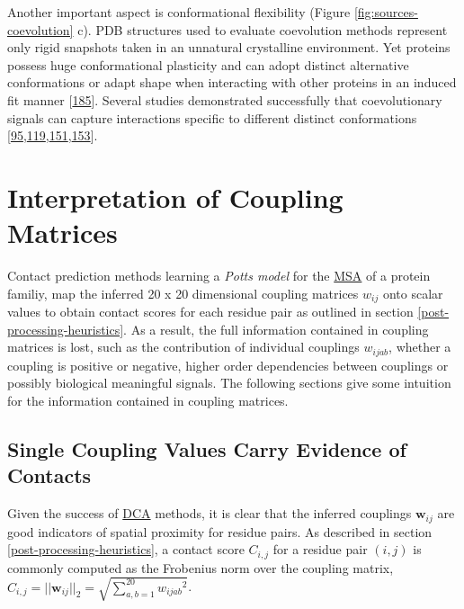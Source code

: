 \documentclass[11pt,a4paper,twoside]{book}
\newcommand{\wij}{\mathbf{w}_{ij}}
\newcommand{\wijab}{w_{ijab}}
\theoremstyle{definition}
\theoremstyle{definition}
\theoremstyle{remark}
\begin{document}
Another important aspect is conformational flexibility (Figure
\ref{fig:sources-coevolution} c). PDB structures used to evaluate
coevolution methods represent only rigid snapshots taken in an unnatural
crystalline environment. Yet proteins possess huge conformational
plasticity and can adopt distinct alternative conformations or adapt
shape when interacting with other proteins in an induced fit manner
{[}\protect\hyperlink{ref-Noel2016}{185}{]}. Several studies
demonstrated successfully that coevolutionary signals can capture
interactions specific to different distinct conformations
{[}\protect\hyperlink{ref-Morcos2011}{95},\protect\hyperlink{ref-Hopf2012}{119},\protect\hyperlink{ref-Sfriso2016}{151},\protect\hyperlink{ref-Jana2014}{153}{]}.

\chapter{Interpretation of Coupling
Matrices}\label{interpreting-coupling-matrices}

Contact prediction methods learning a \emph{Potts model} for the
\protect\hyperlink{abbrev}{MSA} of a protein familiy, map the inferred
20 x 20 dimensional coupling matrices \(w_{ij}\) onto scalar values to
obtain contact scores for each residue pair as outlined in section
\ref{post-processing-heuristics}. As a result, the full information
contained in coupling matrices is lost, such as the contribution of
individual couplings \(\wijab\), whether a coupling is positive or
negative, higher order dependencies between couplings or possibly
biological meaningful signals. The following sections give some
intuition for the information contained in coupling matrices.

\section{Single Coupling Values Carry Evidence of
Contacts}\label{correlation-between-couplings-and-class}

Given the success of \protect\hyperlink{abbrev}{DCA} methods, it is
clear that the inferred couplings \(\wij\) are good indicators of
spatial proximity for residue pairs. As described in section
\ref{post-processing-heuristics}, a contact score \(C_{i,j}\) for a
residue pair \((i,j)\) is commonly computed as the Frobenius norm over
the coupling matrix,
\(C_{i,j}=||\wij||_2 = \sqrt{\sum_{a,b=1}^{20} {\wijab}^2}\).
\end{document}
